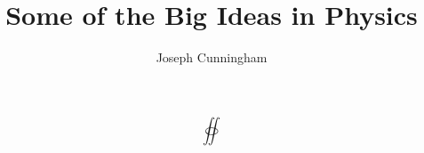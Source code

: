 \documentclass{report}
\title{Some of the Big Ideas in Physics}
\author{Joseph Cunningham}
\date{}
\begin{document}
\[ \oiint  \]
\end{document}
